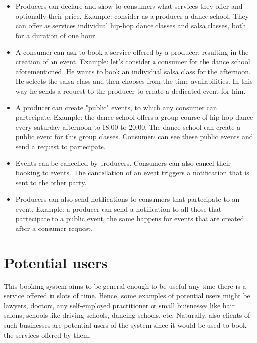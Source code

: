 \documentclass{article}
\begin{document}
\begin{itemize}

	\item Producers can declare and show to consumers what services they
		offer and optionally their price. Example: consider as a
		producer a dance school. They
		can offer as services individual hip-hop dance classes and salsa
		classes, both for a duration of one hour.

	\item A consumer can ask to book a service offered by a producer,
		resulting in the creation of an event. Example: let's consider
		a consumer for the dance school aforementioned. He wants to book
		an individual salsa class for the afternoon. He selects the
		salsa class and then chooses from the time availabilities. In
		this way he sends a request to the producer to create a
		dedicated event for him.

	\item A producer can create "public" events, to which any consumer can
		partecipate. Example: the dance school offers a group course of
		hip-hop dance every saturday afternoon to 18:00 to 20:00. The
		dance school can create a public event for this group classes.
		Consumers can see these public events and send a request to
		partecipate.

	\item Events can be cancelled by producers. Consumers can also cancel
		their booking to events. The cancellation of an event triggers
		a notification that is sent to the other party.

	\item Producers can also send notifications to consumers that
		partecipate to an event. Example: a producer can send a
		notification to all those that partecipate to a public event,
		the same happens for events that are created after a consumer
		request.
\end{itemize}

\section{Potential users}
This booking system aims to be general enough to be
useful any time there is a service offered in slots of time. Hence, some
examples of potential users might be lawyers, doctors, any self-employed
practitioner or small buisnesses like hair salons, schools like driving
schools, dancing schools, etc. Naturally, also clients of such businesses are
potential users of the system since it would be used to book the services
offered by them.
\end{document}
